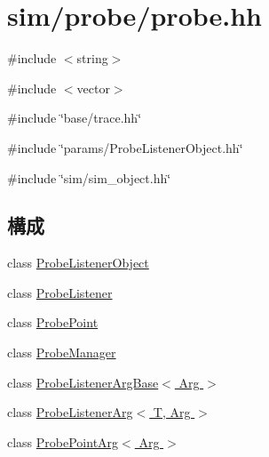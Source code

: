 \hypertarget{probe_8hh}{
\section{sim/probe/probe.hh}
\label{probe_8hh}
}
{\ttfamily \#include $<$string$>$}\par
{\ttfamily \#include $<$vector$>$}\par
{\ttfamily \#include \char`\"{}base/trace.hh\char`\"{}}\par
{\ttfamily \#include \char`\"{}params/ProbeListenerObject.hh\char`\"{}}\par
{\ttfamily \#include \char`\"{}sim/sim\_\-object.hh\char`\"{}}\par
\subsection*{構成}
\begin{DoxyCompactItemize}
\item 
class \hyperlink{classProbeListenerObject}{ProbeListenerObject}
\item 
class \hyperlink{classProbeListener}{ProbeListener}
\item 
class \hyperlink{classProbePoint}{ProbePoint}
\item 
class \hyperlink{classProbeManager}{ProbeManager}
\item 
class \hyperlink{classProbeListenerArgBase}{ProbeListenerArgBase$<$ Arg $>$}
\item 
class \hyperlink{classProbeListenerArg}{ProbeListenerArg$<$ T, Arg $>$}
\item 
class \hyperlink{classProbePointArg}{ProbePointArg$<$ Arg $>$}
\end{DoxyCompactItemize}
